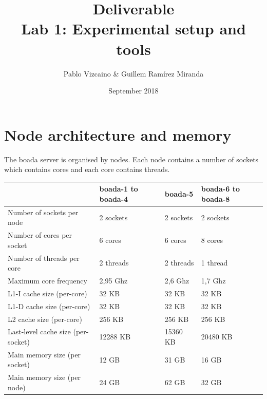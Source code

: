 \documentclass{article}
\title{Deliverable \\
       \large Lab 1: Experimental setup and tools }
\author{Pablo Vizcaino & Guillem Ramírez Miranda}
\date{September 2018}
\begin{document}
\maketitle

\section*{Node architecture and memory}

The boada server is organised by nodes. Each node contains a number of sockets which contains cores and each core contains threads. 


\begin{center}
    \begin{tabular}{ | l || l | l | p{5cm} |}
    \hline
            & boada-1 to boada-4& boada-5 & boada-6 to boada-8 \\ \hline
    Number of sockets per node         & 2 sockets & 2 sockets & 2 sockets \\ \hline
    Number of cores per socket         & 6 cores   & 6 cores   & 8 cores \\ \hline
    Number of threads per core         & 2 threads & 2 threads & 1 thread\\ \hline
    Maximum core frequency             & 2,95 Ghz  & 2,6 Ghz & 1,7 Ghz \\ \hhline{|=|=|=|=|}
    L1-I cache size (per-core)         & 32 KB     & 32 KB & 32 KB \\ \hline
    L1-D cache size (per-core)         & 32 KB     & 32 KB  & 32 KB \\ \hline
    L2 cache size (per-core)           & 256 KB    & 256 KB & 256 KB\\ \hline
    Last-level cache size (per-socket) & 12288 KB  & 15360 KB & 20480 KB \\ \hhline{|=|=|=|=|}
    Main memory size (per socket)      & 12 GB     & 31 GB & 16 GB\\ \hline
    Main memory size (per node)        & 24 GB     & 62 GB & 32 GB \\ \hline

    \end{tabular}
\end{center}
\end{document}
